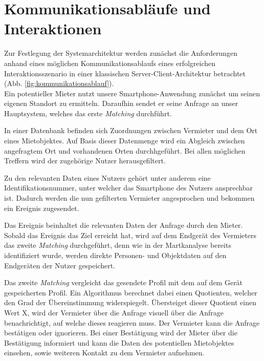 
\section{Kommunikationsabläufe und Interaktionen}

Zur Festlegung der Systemarchitektur werden zunächst die Anforderungen anhand eines möglichen Kommunikationsablaufs eines erfolgreichen Interaktionsszenario in einer klassischen Server-Client-Architektur betrachtet (Abb. \ref{fig:kommunikationsablauf}).\\

Ein potentieller Mieter nutzt unsere Smartphone-Anwendung zunächst um seinen eigenen Standort zu ermitteln. Daraufhin sendet er seine Anfrage an unser Hauptsystem, welches das erste \textit{Matching} durchführt.

In einer Datenbank befinden sich Zuordnungen zwischen Vermieter und dem Ort eines Mietobjektes. Auf Basis dieser Datenmenge wird ein Abgleich zwischen angefragtem Ort und vorhandenen Orten durchhgeführt. Bei allen möglichen Treffern wird der zugehörige Nutzer herausgefiltert.

Zu den relevanten Daten eines Nutzers gehört unter anderem eine Identifikationsnummer, unter welcher das Smartphone des Nutzers ansprechbar ist.
Dadurch werden die nun gefilterten Vermieter angesprochen und bekommen ein Ereignis zugesendet.

Das Ereignis beinhaltet die relevanten Daten der Anfrage durch den Mieter. Sobald das Ereignis das Ziel erreicht hat, wird auf dem Endgerät des Vermieters das zweite \textit{Matching} durchgeführt, denn wie in der Martkanalyse bereits identifiziert wurde, werden direkte Personen- und Objektdaten auf den Endgeräten der Nutzer gespeichert.

Das zweite \textit{Matching} vergleicht das gesendete Profil mit dem auf dem Gerät gespeicherten Profil. Ein Algorithmus berechnet dabei einen Quotienten, welcher den Grad der Übereinstimmung widerspiegelt. Übersteiget dieser Quotient einen Wert X, wird der Vermieter über die Anfrage visuell über die Anfrage benachrichtigt, auf welche dieses reagieren muss.
Der Vermieter kann die Anfrage bestätigen oder ignorieren. Bei einer Bestätigung wird der Mieter über die Bestätigung informiert und kann die Daten des potentiellen Mietobjektes einsehen, sowie weiteren Kontakt zu dem Vermieter aufnehmen.

